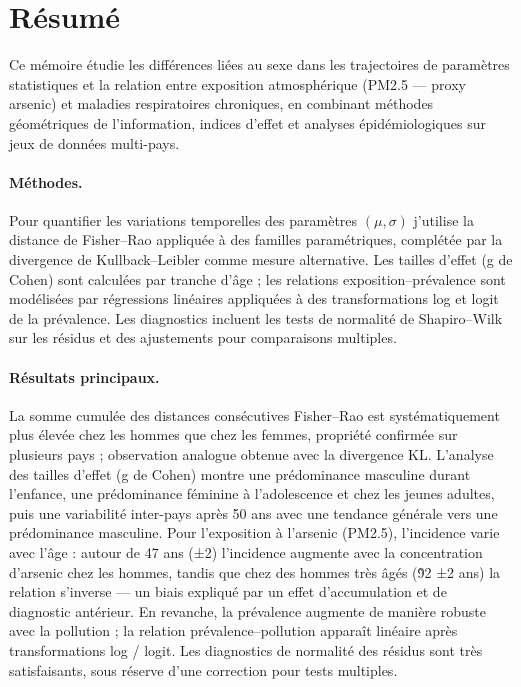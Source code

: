 \section{Résumé}

Ce mémoire étudie les différences liées au sexe dans les trajectoires de paramètres statistiques et la relation entre exposition atmosphérique (PM2.5 — proxy arsenic) et maladies respiratoires chroniques, en combinant méthodes géométriques de l’information, indices d’effet et analyses épidémiologiques sur jeux de données multi-pays.

\paragraph{Méthodes.} Pour quantifier les variations temporelles des paramètres $(\mu,\sigma)$ j’utilise la distance de Fisher–Rao appliquée à des familles paramétriques, complétée par la divergence de Kullback–Leibler comme mesure alternative. Les tailles d’effet (g de Cohen) sont calculées par tranche d’âge ; les relations exposition–prévalence sont modélisées par régressions linéaires appliquées à des transformations log et logit de la prévalence. Les diagnostics incluent les tests de normalité de Shapiro–Wilk sur les résidus et des ajustements pour comparaisons multiples.

\paragraph{Résultats principaux.} La somme cumulée des distances consécutives Fisher–Rao est systématiquement plus élevée chez les hommes que chez les femmes, propriété confirmée sur plusieurs pays ; observation analogue obtenue avec la divergence KL. L’analyse des tailles d’effet (g de Cohen) montre une prédominance masculine durant l’enfance, une prédominance féminine à l’adolescence et chez les jeunes adultes, puis une variabilité inter-pays après 50 ans avec une tendance générale vers une prédominance masculine. Pour l’exposition à l’arsenic (PM2.5), l’incidence varie avec l’âge : autour de 47 ans (±2) l’incidence augmente avec la concentration d’arsenic chez les hommes, tandis que chez des hommes très âgés (\~92 ±2 ans) la relation s’inverse — un biais expliqué par un effet d’accumulation et de diagnostic antérieur. En revanche, la prévalence augmente de manière robuste avec la pollution ; la relation prévalence–pollution apparaît linéaire après transformations log / logit. Les diagnostics de normalité des résidus sont très satisfaisants, sous réserve d’une correction pour tests multiples.

